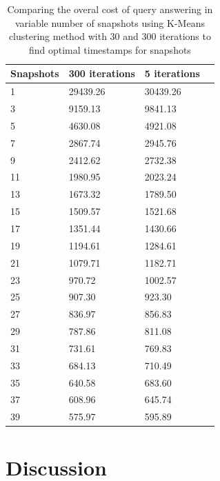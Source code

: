 			\begin {center}
			\begin{table}
				\centering
				\caption{Comparing the overal cost of query answering in variable number of snapshots using K-Means clustering method with 30 and 300 iterations to find optimal timestamps for snapshots}
				\label {table:compare_clustring_iterations}
				\begin{tabular}{p{2cm}p{3cm}p{3cm}p{3cm}}
					\hline
					Snapshots  & 300 iterations  & 5 iterations \\ \hline
					1 & 29439.26 & 30439.26 \\  
					3 & 9159.13  & 9841.13\\
					5 & 4630.08  & 4921.08\\
					7 & 2867.74  & 2945.76\\
					9 & 2412.62  & 2732.38\\
					11 & 1980.95  & 2023.24\\
					13 & 1673.32  & 1789.50\\
					15 & 1509.57  & 1521.68\\
					17 & 1351.44  & 1430.66\\
					19 & 1194.61  & 1284.61\\
					21 & 1079.71  & 1182.71\\
					23 & 970.72  & 1002.57\\
					25 & 907.30  & 923.30\\
					27 & 836.97  & 856.83\\
					29 & 787.86  & 811.08\\
					31 & 731.61  & 769.83\\
					33 & 684.13  & 710.49\\
					35 & 640.58  & 683.60\\
					37 & 608.96  & 645.74\\
					39 & 575.97  & 595.89\\\hline
				\end{tabular}
			\end{table}
			\end{center}

	\section{Discussion}
